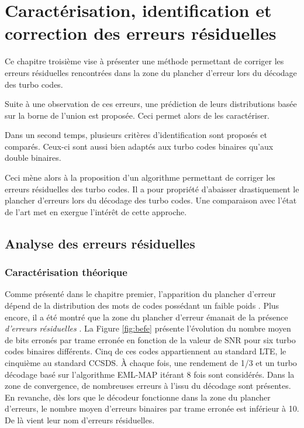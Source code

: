 \chapter{Caractérisation, identification et correction des erreurs résiduelles} %
Ce chapitre troisième vise à présenter une méthode permettant de corriger les erreurs résiduelles rencontrées dans la zone
du plancher d'erreur lors du décodage des turbo codes.

Suite à une observation de ces erreurs, une prédiction de leurs distributions basée sur la borne de l'union est proposée. 
Ceci permet alors de les caractériser.

Dans un second temps, plusieurs critères d'identification sont proposés et comparés. Ceux-ci 
sont aussi bien adaptés aux turbo codes binaires qu'aux double binaires.

Ceci mène alors à la proposition d'un algorithme permettant de corriger les erreurs résiduelles des turbo codes.
Il a pour propriété d'abaisser drastiquement le plancher d'erreurs lors du décodage des turbo codes.
Une comparaison avec l'état de l'art met en exergue l’intérêt de cette approche.


\vspace*{\fill}
\minitocTITI
\vspace*{\fill}
\newpage

\section{Analyse des erreurs résiduelles}
\subsection{Caractérisation théorique}
Comme présenté dans le chapitre premier, l'apparition du plancher d'erreur dépend de la distribution des mots de codes 
possédant un faible poids \cite{distance_spectrum}. Plus encore, il a été montré que la zone du plancher d'erreur émanait 
de la présence \emph{d'erreurs résiduelles} \cite{takeshitaBCH}. 
La Figure \ref{fig:befe} présente l'évolution du nombre moyen de bits erronés par trame erronée en fonction de la valeur de 
SNR pour six turbo codes binaires différents. Cinq de ces codes appartiennent au standard LTE, le cinquième au standard CCSDS. 
À chaque fois, une rendement de 1/3 et un turbo décodage basé sur l'algorithme EML-MAP itérant 8 fois sont considérés. Dans la zone de 
convergence, de nombreuses erreurs à l'issu du décodage sont présentes. En revanche, dès lors que le décodeur 
fonctionne dans la zone du plancher d'erreurs, le nombre moyen d'erreurs binaires par trame erronée est inférieur à 10. 
De là vient leur nom d'erreurs résiduelles.


